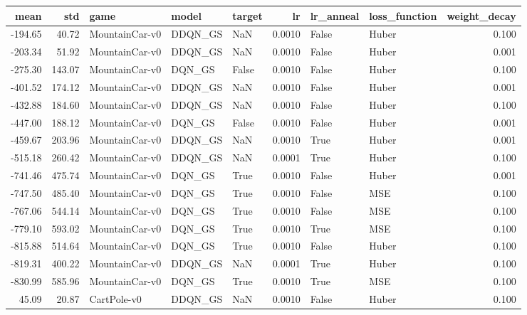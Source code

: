 \begin{tabular}{rrlllrllr}
\toprule
   mean &     std &            game &    model & target &      lr & lr\_anneal & loss\_function &  weight\_decay \\
\midrule
-194.65 &   40.72 &  MountainCar-v0 &  DDQN\_GS &    NaN &  0.0010 &     False &         Huber &         0.100 \\
-203.34 &   51.92 &  MountainCar-v0 &  DDQN\_GS &    NaN &  0.0010 &     False &         Huber &         0.001 \\
-275.30 &  143.07 &  MountainCar-v0 &   DQN\_GS &  False &  0.0010 &     False &         Huber &         0.100 \\
-401.52 &  174.12 &  MountainCar-v0 &  DDQN\_GS &    NaN &  0.0010 &     False &         Huber &         0.001 \\
-432.88 &  184.60 &  MountainCar-v0 &  DDQN\_GS &    NaN &  0.0010 &     False &         Huber &         0.100 \\
-447.00 &  188.12 &  MountainCar-v0 &   DQN\_GS &  False &  0.0010 &     False &         Huber &         0.001 \\
-459.67 &  203.96 &  MountainCar-v0 &  DDQN\_GS &    NaN &  0.0010 &      True &         Huber &         0.001 \\
-515.18 &  260.42 &  MountainCar-v0 &  DDQN\_GS &    NaN &  0.0001 &      True &         Huber &         0.100 \\
-741.46 &  475.74 &  MountainCar-v0 &   DQN\_GS &   True &  0.0010 &     False &         Huber &         0.001 \\
-747.50 &  485.40 &  MountainCar-v0 &   DQN\_GS &   True &  0.0010 &     False &           MSE &         0.100 \\
-767.06 &  544.14 &  MountainCar-v0 &   DQN\_GS &   True &  0.0010 &     False &           MSE &         0.100 \\
-779.10 &  593.02 &  MountainCar-v0 &   DQN\_GS &   True &  0.0010 &      True &           MSE &         0.100 \\
-815.88 &  514.64 &  MountainCar-v0 &   DQN\_GS &   True &  0.0010 &     False &         Huber &         0.100 \\
-819.31 &  400.22 &  MountainCar-v0 &  DDQN\_GS &    NaN &  0.0001 &      True &         Huber &         0.100 \\
-830.99 &  585.96 &  MountainCar-v0 &   DQN\_GS &   True &  0.0010 &      True &           MSE &         0.100 \\
  45.09 &   20.87 &     CartPole-v0 &  DDQN\_GS &    NaN &  0.0010 &     False &         Huber &         0.100 \\

\end{tabular}
